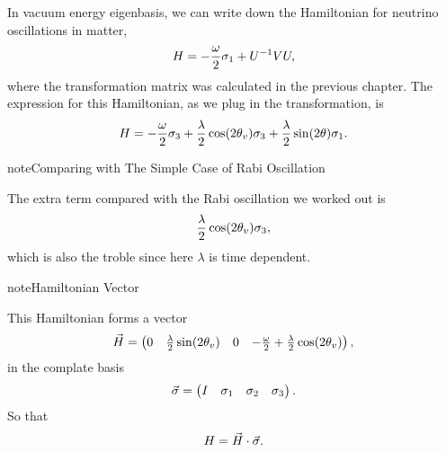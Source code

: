 \documentclass[letterpaper,12pt,english]{sphinxmanual}
\begin{document}
In vacuum energy eigenbasis, we can write down the Hamiltonian for neutrino oscillations in matter,
\begin{gather}
\begin{split}H =  -\frac{\omega}{2} \sigma_1 + U^{-1} V U,\end{split}\notag
\end{gather}
where the transformation matrix was calculated in the previous chapter. The expression for this Hamiltonian, as we plug in the transformation, is
\begin{gather}
\begin{split}H = -\frac{\omega}{2} \sigma_3 + \frac{\lambda}{2}\cos(2\theta_v) \sigma_3 + \frac{\lambda}{2}\sin(2\theta) \sigma_1 .\end{split}\notag
\end{gather}
\begin{notice}{note}{Comparing with The Simple Case of Rabi Oscillation}

The extra term compared with the Rabi oscillation we worked out is
\begin{gather}
\begin{split}\frac{\lambda}{2}\cos(2\theta_v) \sigma_3,\end{split}\notag
\end{gather}
which is also the troble since here \(\lambda\) is time dependent.
\end{notice}

\begin{notice}{note}{Hamiltonian Vector}

This Hamiltonian forms a vector
\begin{gather}
\begin{split}\vec H = \begin{pmatrix}  0 & \frac{\lambda}{2}\sin(2\theta_v) & 0 & -\frac{\omega}{2} + \frac{\lambda}{2} \cos(2\theta_v)  \end{pmatrix},\end{split}\notag
\end{gather}
in the complate basis
\begin{gather}
\begin{split}\vec \sigma = \begin{pmatrix}  I & \sigma_1 & \sigma_2 & \sigma_3  \end{pmatrix}.\end{split}\notag
\end{gather}
So that
\begin{gather}
\begin{split}H = \vec H \cdot \vec \sigma.\end{split}\notag
\end{gather}\end{notice}
\end{document}
